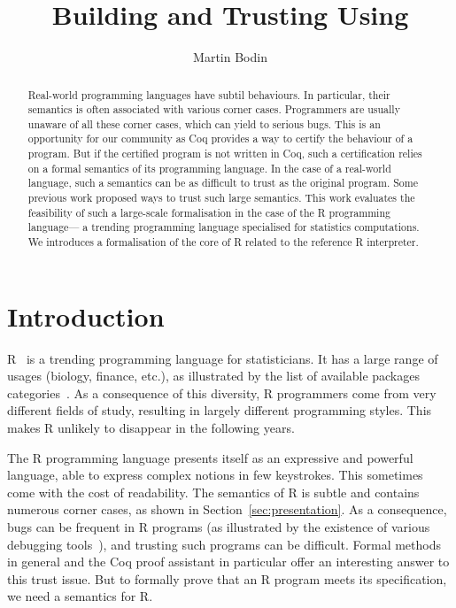 \documentclass[9pt, sigplan, natbib=false, screen=true]{acmart}
\title{Building and Trusting \R{} Using \Coq{}}
\author{Martin Bodin}
\affiliation{
    \institution{Center of Mathematical Modeling}
    \streetaddress{Beauchef 851}
    \city{Santiago}
    \country{Chile}
}
\newcommand\Coq{Coq}
\newcommand\R{R}
\begin{document}
\begin{abstract}
Real-world programming languages have subtil behaviours.
In particular, their semantics is often associated with
various corner cases.
Programmers are usually unaware of all these corner cases,
which can yield to serious bugs.
This is an opportunity for our community
as \Coq{} provides a way to certify the behaviour of a program.
But if the certified program is not written in \Coq{},
such a certification relies on a formal semantics of its programming language.
In the case of a real-world language, such a semantics
can be as difficult to trust as the original program.
Some previous work proposed ways to trust such large semantics.
This work evaluates the feasibility of such a large-scale formalisation
in the case of the \R{} programming language—%
a trending programming language specialised for statistics computations.
We introduces a formalisation of the core of \R{}
related to the reference \R{} interpreter.
\end{abstract}

\maketitle

\section{Introduction}
\label{sec:introduction}

\R{}~\parencite{ihaka1996r, Rwebsite} is a trending
programming language for statisticians.
It has a large range of usages (biology, finance, etc.),
as illustrated by the list of available packages categories~\parencite{rviews}.
As a consequence of this diversity,
\R{} programmers come from very different fields of study,
resulting in largely different programming styles.
This makes \R{} unlikely to disappear
in the following years.

The \R{} programming language presents itself
as an expressive and powerful language,
able to express complex notions in few keystrokes.
This sometimes come with the cost of readability.
The semantics of \R{} is subtle
and contains numerous corner cases,
as shown in Section~\ref{sec:presentation}.
%
As a consequence, bugs can be frequent in \R{} programs
(as illustrated by the existence of various debugging tools~\parencite{mcpherson2014}),
and trusting such programs can be difficult.
Formal methods in general and the \Coq{} proof assistant in particular
offer an interesting answer to this trust issue.
But to formally prove that an \R{} program meets its specification,
we need a semantics for \R{}.
\end{document}
